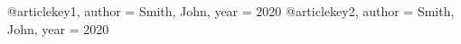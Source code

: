 @article{key1,
  author = {Smith, John},
  year = {2020}
}
@article{key2,
  author = {Smith, John},
  year = {2020}
}
